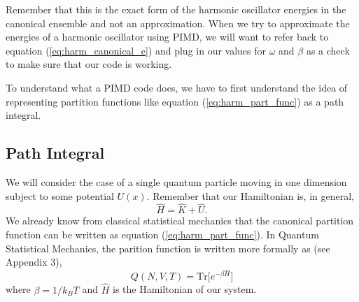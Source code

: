 \documentclass{article}
\newcommand{\be}{\begin{equation}}
\newcommand{\ee}{\end{equation}}
\begin{document}
Remember that this is the exact form of the harmonic oscillator energies in the canonical ensemble and not an approximation. When we try to approximate the energies of a harmonic oscillator using PIMD, we will want to refer back to equation (\ref{eq:harm_canonical_e}) and plug in our values for $\omega$ and $\beta$ as a check to make sure that our code is working.

To understand what a PIMD code does, we have to first understand the idea of representing partition functions like equation (\ref{eq:harm_part_func}) as a path integral.

\subsection{Path Integral}
We will consider the case of a single quantum particle moving in one dimension subject to some potential $U(x)$.
Remember that our Hamiltonian is, in general,
\be
  \hat{H} = \hat{K} + \hat{U} .
\ee
We already know from classical statistical mechanics that the canonical partition function can be written as equation (\ref{eq:harm_part_func}).
In Quantum Statistical Mechanics, the parition function is written more formally as (see Appendix 3),
\be \label{eq:quan_part_func}
  Q(N, V, T) = \text{Tr}\Big[ e^{- \beta \hat{H}} \Big]
\ee
where $\beta = 1/k_BT$ and $\hat{H}$ is the Hamiltonian of our system.
\end{document}
